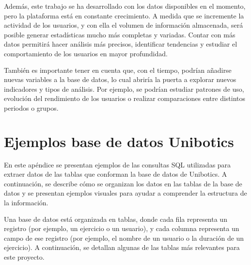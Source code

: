 \documentclass[a4paper, 12pt]{book}
\begin{document}
Además, este trabajo se ha desarrollado con los datos disponibles en el momento, pero la plataforma está en constante crecimiento. A medida que se incremente la actividad de los usuarios, y con ella el volumen de información almacenada, será posible generar estadísticas mucho más completas y variadas. Contar con más datos permitirá hacer análisis más precisos, identificar tendencias y estudiar el comportamiento de los usuarios en mayor profundidad.

También es importante tener en cuenta que, con el tiempo, podrían añadirse nuevas variables a la base de datos, lo cual abriría la puerta a explorar nuevos indicadores y tipos de análisis. Por ejemplo, se podrían estudiar patrones de uso, evolución del rendimiento de los usuarios o realizar comparaciones entre distintos periodos o grupos.


\printglossary[type=\acronymtype]

\printglossary


\cleardoublepage
\appendix
\chapter{Ejemplos base de datos Unibotics}
\label{sec:appA}


En este apéndice se presentan ejemplos de las consultas SQL utilizadas para extraer datos de las tablas que conforman la base de datos de Unibotics. A continuación, se describe cómo se organizan los datos en las tablas de la base de datos y se presentan ejemplos visuales para ayudar a comprender la estructura de la información.

Una base de datos está organizada en tablas, donde cada fila representa un registro (por ejemplo, un ejercicio o un usuario), y cada columna representa un campo de ese registro (por ejemplo, el nombre de un usuario o la duración de un ejercicio). A continuación, se detallan algunas de las tablas más relevantes para este proyecto.
\end{document}
